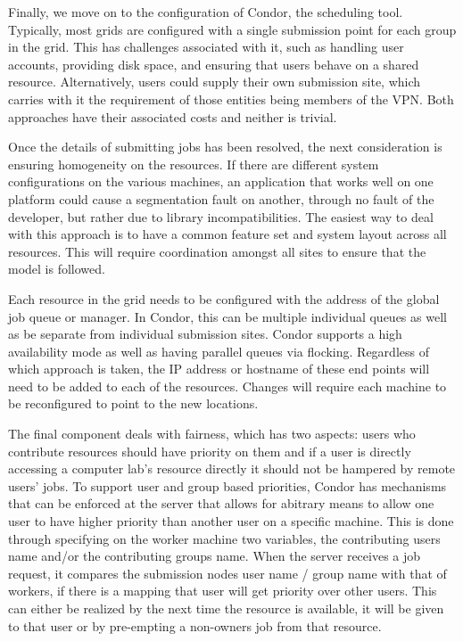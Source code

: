 \documentclass[conference]{IEEEtran}
\begin{document}
Finally, we move on to the configuration of Condor, the scheduling tool.
Typically, most grids are configured with a single submission point for each
group in the grid.  This has challenges associated with it, such as handling
user accounts, providing disk space, and ensuring that users behave on a shared
resource.  Alternatively, users could supply their own submission site, which
carries with it the requirement of those entities being members of the VPN.
Both approaches have their associated costs and neither is trivial.

Once the details of submitting jobs has been resolved, the next consideration
is ensuring homogeneity on the resources.  If there are different system
configurations on the various machines, an application that works well on one
platform could cause a segmentation fault on another, through no fault of the
developer, but rather due to library incompatibilities.  The easiest way to
deal with this approach is to have a common feature set and system layout
across all resources.  This will require coordination amongst all sites to
ensure that the model is followed.

Each resource in the grid needs to be configured with the address of the global
job queue or manager.  In Condor, this can be multiple individual queues as
well as be separate from individual submission sites.  Condor supports a high
availability mode as well as having parallel queues via flocking.  Regardless
of which approach is taken, the IP address or hostname of these end points will
need to be added to each of the resources.  Changes will require each machine
to be reconfigured to point to the new locations.

The final component deals with fairness, which has two aspects:  users who
contribute resources should have priority on them and if a user is directly
accessing a computer lab's resource directly it should not be hampered by
remote users' jobs.  To support user and group based priorities, Condor has
mechanisms that can be enforced at the server that allows for abitrary means to
allow one user to have higher priority than another user on a specific machine.
This is done through specifying on the worker machine two variables, the
contributing users name and/or the contributing groups name.  When the server
receives a job request, it compares the submission nodes user name / group name
with that of workers, if there is a mapping that user will get priority over
other users.  This can either be realized by the next time the resource is
available, it will be given to that user or by pre-empting a non-owners job
from that resource.
\end{document}

